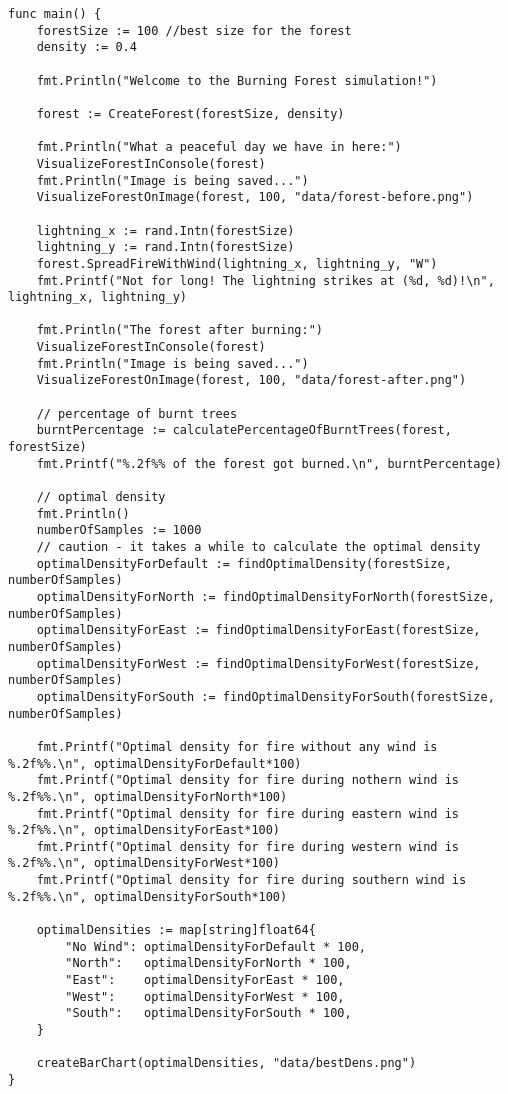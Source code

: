 \documentclass{article}
\begin{document}
\begin{lstlisting}
func main() {
	forestSize := 100 //best size for the forest
	density := 0.4

	fmt.Println("Welcome to the Burning Forest simulation!")

	forest := CreateForest(forestSize, density)

	fmt.Println("What a peaceful day we have in here:")
	VisualizeForestInConsole(forest)
	fmt.Println("Image is being saved...")
	VisualizeForestOnImage(forest, 100, "data/forest-before.png")

	lightning_x := rand.Intn(forestSize)
	lightning_y := rand.Intn(forestSize)
	forest.SpreadFireWithWind(lightning_x, lightning_y, "W")
	fmt.Printf("Not for long! The lightning strikes at (%d, %d)!\n", lightning_x, lightning_y)

	fmt.Println("The forest after burning:")
	VisualizeForestInConsole(forest)
	fmt.Println("Image is being saved...")
	VisualizeForestOnImage(forest, 100, "data/forest-after.png")

	// percentage of burnt trees
	burntPercentage := calculatePercentageOfBurntTrees(forest, forestSize)
	fmt.Printf("%.2f%% of the forest got burned.\n", burntPercentage)

	// optimal density
	fmt.Println()
	numberOfSamples := 1000
	// caution - it takes a while to calculate the optimal density
	optimalDensityForDefault := findOptimalDensity(forestSize, numberOfSamples)
	optimalDensityForNorth := findOptimalDensityForNorth(forestSize, numberOfSamples)
	optimalDensityForEast := findOptimalDensityForEast(forestSize, numberOfSamples)
	optimalDensityForWest := findOptimalDensityForWest(forestSize, numberOfSamples)
	optimalDensityForSouth := findOptimalDensityForSouth(forestSize, numberOfSamples)

	fmt.Printf("Optimal density for fire without any wind is %.2f%%.\n", optimalDensityForDefault*100)
	fmt.Printf("Optimal density for fire during nothern wind is %.2f%%.\n", optimalDensityForNorth*100)
	fmt.Printf("Optimal density for fire during eastern wind is %.2f%%.\n", optimalDensityForEast*100)
	fmt.Printf("Optimal density for fire during western wind is %.2f%%.\n", optimalDensityForWest*100)
	fmt.Printf("Optimal density for fire during southern wind is %.2f%%.\n", optimalDensityForSouth*100)

	optimalDensities := map[string]float64{
		"No Wind": optimalDensityForDefault * 100,
		"North":   optimalDensityForNorth * 100,
		"East":    optimalDensityForEast * 100,
		"West":    optimalDensityForWest * 100,
		"South":   optimalDensityForSouth * 100,
	}

	createBarChart(optimalDensities, "data/bestDens.png")
}

\end{lstlisting}
\end{document}
